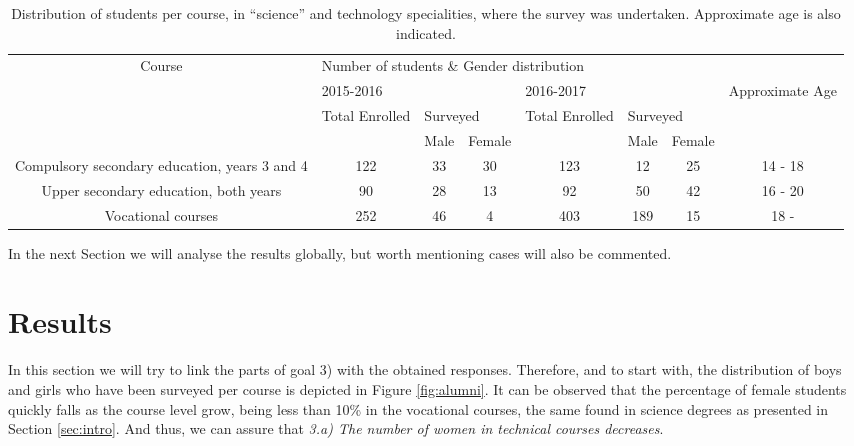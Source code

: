 \documentclass[journal,transmag]{IEEEtran}
\begin{document}
\begin{table}
  \caption[Students who undertook the surveys]{Distribution of students per course, in ``science'' and technology specialities, where the survey was undertaken. Approximate age is also indicated.}
  \label{tab:muestra}

  \begin{center}
    \begin{tabular}{|c|c|c|c|c|c|c|c|}
    	\hline
    	\multirow{4}{*}{Course} & \multicolumn{7}{l|}{Number of students \& Gender distribution} \\ \cline{2-8}
    	& \multicolumn{3}{l|}{2015-2016} & \multicolumn{3}{l|}{2016-2017} & \multirow{3}{*}{Approximate Age} \\ \cline{2-7}
    	& \multirow{2}{*}{Total Enrolled} & \multicolumn{2}{l|}{Surveyed} & \multirow{2}{*}{Total Enrolled} & \multicolumn{2}{l|}{Surveyed} & \\ \cline{3-4} \cline{6-7}
    	& & Male & Female & & Male & Female & \\ \hline
    	Compulsory secondary education, years 3 and 4 & 122 & 33 & 30 & 123 & 12  & 25 & 14 - 18 \\ \hline
    	Upper secondary education, both years         & 90  & 28 & 13 & 92  & 50  & 42 & 16 - 20 \\ \hline
    	Vocational courses                            & 252 & 46 & 4  & 403 & 189 & 15 & 18 -    \\ \hline
    \end{tabular}
  \end{center}
\end{table}

In the next Section we will analyse the results globally, but worth mentioning cases will also be commented.

\section{Results}
\label{sec:results}

In this section we will try to link the parts of goal 3) with the obtained responses. Therefore, and to start with, the distribution of boys and girls who have been surveyed per course is depicted in Figure \ref{fig:alumni}. It can be observed that the percentage of female students quickly falls as the course level grow, being less than 10\% in the vocational courses, the same found in science degrees as presented in Section \ref{sec:intro}. And thus, we can assure that \textit{3.a) The number of women in technical courses decreases}.
\end{document}
